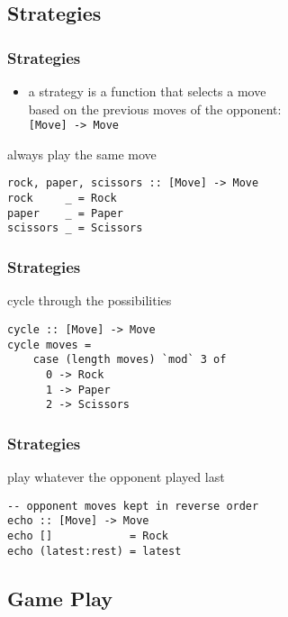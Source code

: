 \documentclass[dvipsnames]{beamer}
\theoremstyle{plain}
\begin{document}
\subsection{Strategies}

\begin{frame}[fragile]
  \frametitle{Strategies}

  \begin{itemize}
    \item a strategy is a function that selects a move\\
      based on the previous moves of the opponent:\\
      \smallskip
      \lstinline{[Move] -> Move}
  \end{itemize}

  \begin{exampleblock}{always play the same move}
    \begin{lstlisting}
rock, paper, scissors :: [Move] -> Move
rock     _ = Rock
paper    _ = Paper
scissors _ = Scissors
    \end{lstlisting}
  \end{exampleblock}
\end{frame}

\begin{frame}[fragile]
  \frametitle{Strategies}

  \begin{exampleblock}{cycle through the possibilities}
    \begin{lstlisting}
cycle :: [Move] -> Move
cycle moves =
    case (length moves) `mod` 3 of
      0 -> Rock
      1 -> Paper
      2 -> Scissors
    \end{lstlisting}
  \end{exampleblock}
\end{frame}

\begin{frame}[fragile]
  \frametitle{Strategies}

  \begin{exampleblock}{play whatever the opponent played last}
    \begin{lstlisting}
-- opponent moves kept in reverse order
echo :: [Move] -> Move
echo []            = Rock
echo (latest:rest) = latest
    \end{lstlisting}
  \end{exampleblock}
\end{frame}

\subsection{Game Play}
\end{document}
